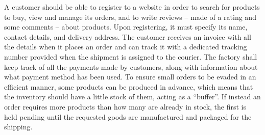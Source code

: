 A customer should be able to register to a website in order to search for products to buy, view and manage its orders, and to write reviews -- made of a rating and some comments -- about products. Upon registering, it must specify its name, contact details, and delivery address. The customer receives an invoice with all the details when it places an order and can track it with a dedicated tracking number provided when the shipment is assigned to the courier. The factory shall keep track of all the payments made by customers, along with information about what payment method has been used. To ensure small orders to be evaded in an efficient manner, some products can be produced in advance, which means that the inventory should have a little stock of them, acting as a ``buffer''. If instead an order requires more products than how many are already in stock, the first is held pending until the requested goods are manufactured and packaged for
the shipping.


